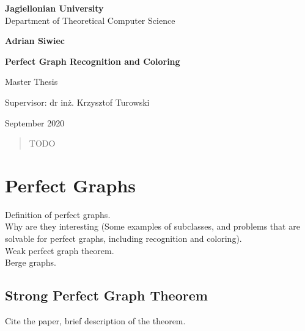 \documentclass{article}
\author{Adrian Siwiec}
\date{\today{}}
\begin{document}
\begin{titlepage}
	\begin{center}
        
		\large
		\textbf{Jagiellonian University}\\
		Department of Theoretical Computer Science\\

		\vspace{1.5cm}

		\Large
		\textbf{Adrian Siwiec}

		\vspace*{2cm}

		\textbf{\LARGE Perfect Graph Recognition and Coloring}
		
		\vspace{0.5cm}
		\large
		
		\vfill
		\Large
		Master Thesis

		\vfill
		\Large
		Supervisor: dr inż. Krzysztof Turowski
		
		\vspace{0.8cm}
		
		September 2020
		
\end{center}
\end{titlepage}

\pagebreak

\begin{abstract}
TODO
\end{abstract}

\tableofcontents

\pagebreak

\section{Perfect Graphs}
Definition of perfect graphs.\\

Why are they interesting (Some examples of subclasses, and problems that are solvable for perfect graphs, including recognition and coloring).\\

Weak perfect graph theorem.\\

Berge graphs.

\subsection{Strong Perfect Graph Theorem}
Cite the paper, brief description of the theorem.
\end{document}

